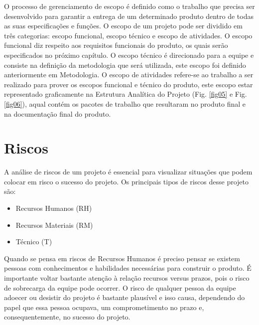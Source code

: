 O processo de gerenciamento de escopo é definido como o trabalho que precisa ser desenvolvido para garantir a entrega de um determinado produto dentro de todas as suas especificações e funções. O escopo de um projeto pode ser dividido em três categorias: escopo funcional, escopo técnico e escopo de atividades. O escopo funcional diz respeito aos requisitos funcionais do produto, os quais serão especificados no próximo capítulo. O escopo técnico é direcionado para a equipe e consiste na definição da metodologia que será utilizada, este escopo foi definido anteriormente em Metodologia. O escopo de atividades refere-se ao trabalho a ser realizado para prover os escopos funcional e técnico do produto, este escopo estar representado graficamente na Estrutura Analítica do Projeto (Fig. \ref{fig05} e Fig. \ref{fig06}), aqual contém os pacotes de trabalho que resultaram no produto final e na documentação final do produto. 




\section[Riscos]{Riscos}

A análise de riscos de um projeto é essencial para visualizar situações que podem colocar em risco o sucesso do projeto. Os principais tipos de riscos desse projeto são:

\begin{itemize}
\item Recursos Humanos (RH)
\item Recursos Materiais (RM)
\item Técnico (T)
\end{itemize}

Quando se pensa em riscos de Recursos Humanos é preciso pensar se existem pessoas com conhecimentos e habilidades necessárias para construir o produto. É importante voltar bastante atenção à relação recursos versus prazos, pois o risco de sobrecarga da equipe pode ocorrer. O risco de qualquer pessoa da equipe adoecer ou desistir do projeto é bastante plausível e isso causa, dependendo do papel que essa pessoa ocupava, um comprometimento no prazo e, consequentemente, no sucesso do projeto.

